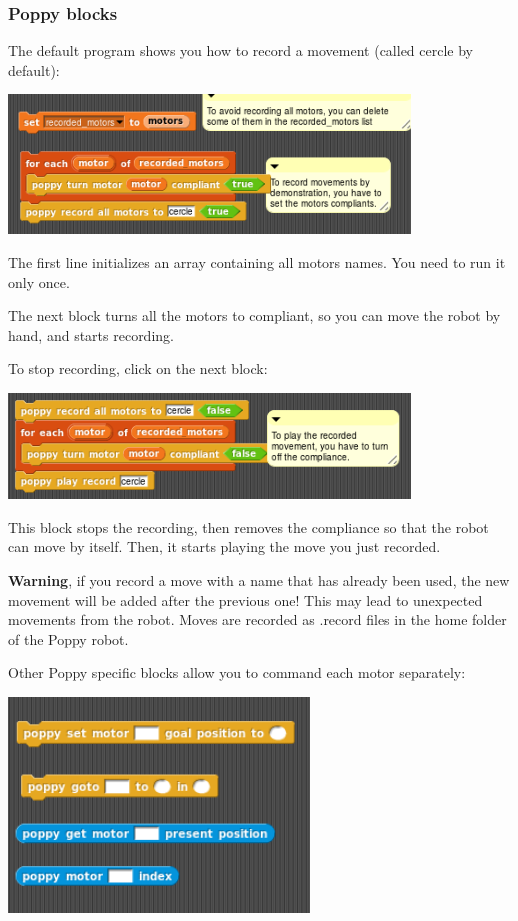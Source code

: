 \documentclass{article}
\begin{document}
\subsubsection{Poppy blocks}

The default program shows you how to record a movement (called cercle by default):

 \begin{center}
  \includegraphics[width=0.8\textwidth]{img/snap_record}
 \end{center}
 
 The first line initializes an array containing all motors names. You need to run it only once.
 
 The next block turns all the motors to compliant, so you can move the robot by hand, and starts recording.
 
 To stop recording, click on the next block:
 
 
 \begin{center}
  \includegraphics[width=0.8\textwidth]{img/snap_move}
 \end{center}
 
 This block stops the recording, then removes the compliance so that the robot can move by itself. Then, it starts playing the move you just recorded.
 
 \textbf{Warning}, if you record a move with a name that has already been used, the new movement will be added after the previous one! This may lead to unexpected movements from the robot. Moves are recorded as .record files in the home folder of the Poppy robot.
 
 Other Poppy specific blocks allow you to command each motor separately:
 
  \begin{center}
  \includegraphics[width=0.6\textwidth]{img/snap_blocks}
 \end{center}
\end{document}
